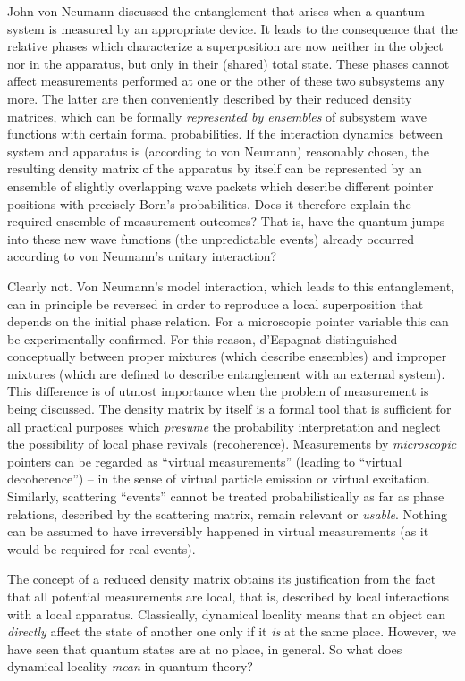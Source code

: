 John von Neumann discussed the entanglement that arises when a quantum
system is measured by an appropriate device. It leads to the
consequence that the relative phases which characterize a
superposition are now neither in the object nor in the apparatus, but
only in their (shared) total state. These phases cannot affect
measurements performed at one or the other of these two subsystems any
more. The latter are then conveniently described by their reduced
density matrices, which can be formally {\it represented by ensembles}
of subsystem wave functions with certain formal probabilities. If the
interaction dynamics between system and apparatus is (according to von
Neumann) reasonably chosen, the resulting density matrix of the
apparatus by itself can be represented by an ensemble of slightly
overlapping wave packets which describe different pointer positions
with precisely Born's probabilities. Does it therefore explain the
required ensemble of measurement outcomes? That is, have the quantum
jumps into these new wave functions (the unpredictable events) already
occurred according to von Neumann's unitary interaction?

Clearly not. Von Neumann's model
interaction, which leads to this entanglement, can in principle be
reversed in order to reproduce a local superposition that depends on
the initial phase relation. For a microscopic pointer variable this
can be experimentally confirmed. For this reason,
d'Espagnat \cite{dE} distinguished conceptually between proper
mixtures (which describe ensembles) and improper mixtures (which are
defined to describe entanglement with an external system). This
difference is of utmost importance when the problem of measurement is
being discussed. The density matrix by itself is a formal tool that is
sufficient for all practical purposes which {\it presume} the
probability interpretation and neglect the possibility of local phase
revivals (recoherence). Measurements by {\it microscopic} pointers can
be regarded as ``virtual measurements'' (leading to ``virtual
decoherence'') -- in the sense of virtual particle
emission or virtual excitation. Similarly, scattering ``events''
cannot be treated probabilistically as far as phase relations,
described by the scattering matrix, remain relevant or {\it usable}.
Nothing can be assumed to have irreversibly happened in virtual
measurements (as it would be required for real events).

The concept of a reduced density matrix obtains its justification from
the fact that all potential measurements are local, that is,
described by local interactions with a local apparatus. Classically,
dynamical locality means that an object can {\it directly} affect the
state of another one only if it {\it is} at the same place. However,
we have seen that quantum states are at no place, in general. So what
does dynamical locality {\it mean} in quantum theory?

